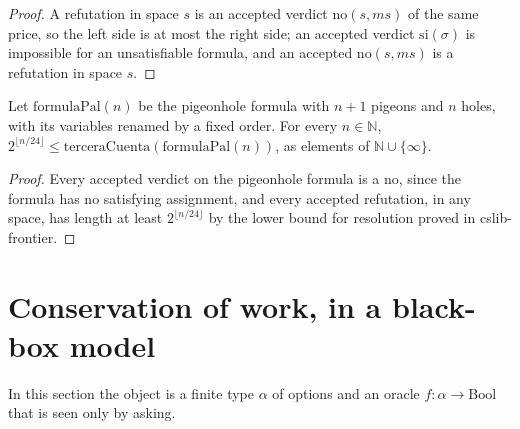 \begin{proof}
  \leanok
  A refutation in space $s$ is an accepted verdict $\mathrm{no}(s, ms)$ of the same price, so the
  left side is at most the right side; an accepted verdict $\mathrm{si}(\sigma)$ is impossible for
  an unsatisfiable formula, and an accepted $\mathrm{no}(s, ms)$ is a refutation in space $s$.
\end{proof}

\begin{theorem}
  \label{thm:information-third-account-pigeonhole}
  \leanok
  Let $\mathrm{formulaPal}(n)$ be the pigeonhole formula with $n + 1$ pigeons and $n$ holes, with
  its variables renamed by a fixed order. For every $n \in \mathbb{N}$,
  $2^{\lfloor n/24 \rfloor} \le \mathrm{terceraCuenta}(\mathrm{formulaPal}(n))$, as elements of
  $\mathbb{N} \cup \{\infty\}$.
  \own{}
\end{theorem}

\begin{proof}
  \leanok
  Every accepted verdict on the pigeonhole formula is a $\mathrm{no}$, since the formula has no
  satisfying assignment, and every accepted refutation, in any space, has length at least
  $2^{\lfloor n/24 \rfloor}$ by the lower bound for resolution proved in cslib-frontier.
\end{proof}

\section{Conservation of work, in a black-box model}
\label{sec:information-work}

In this section the object is a finite type $\alpha$ of options and an oracle $f : \alpha \to
\mathrm{Bool}$ that is seen only by asking.

